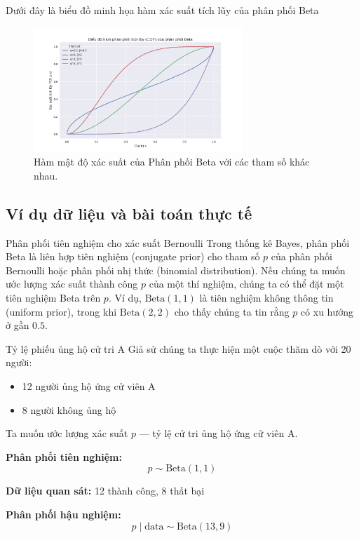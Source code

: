 Dưới đây là biểu đồ minh họa hàm xác suất tích lũy của phân phối Beta

\begin{figure}[h!]
\centering
\includegraphics[width=0.7\textwidth]{images/Beta_Distribution_CDF.png} %
\caption{Hàm mật độ xác suất của Phân phối Beta với các tham số khác nhau.}
\label{fig:Beta_Distribution_CDF}
\end{figure}

\subsection{Ví dụ dữ liệu và bài toán thực tế}
Phân phối tiên nghiệm cho xác suất Bernoulli
Trong thống kê Bayes, phân phối Beta là liên hợp tiên nghiệm (conjugate prior) cho tham số $p$ của phân phối Bernoulli hoặc phân phối nhị thức (binomial distribution). Nếu chúng ta muốn ước lượng xác suất thành công $p$ của một thí nghiệm, chúng ta có thể đặt một tiên nghiệm Beta trên $p$. Ví dụ, $\text{Beta}(1,1)$ là tiên nghiệm không thông tin (uniform prior), trong khi $\text{Beta}(2,2)$ cho thấy chúng ta tin rằng $p$ có xu hướng ở gần $0.5$.

Tỷ lệ phiếu ủng hộ cử tri A
Giả sử chúng ta thực hiện một cuộc thăm dò với 20 người:

\begin{itemize}
  \item 12 người ủng hộ ứng cử viên A
  \item 8 người không ủng hộ
\end{itemize}

Ta muốn ước lượng xác suất $p$ — tỷ lệ cử tri ủng hộ ứng cử viên A.

\textbf{Phân phối tiên nghiệm:}
\[
p \sim \text{Beta}(1, 1)
\]

\textbf{Dữ liệu quan sát:} 12 thành công, 8 thất bại

\textbf{Phân phối hậu nghiệm:}
\[
p \mid \text{data} \sim \text{Beta}(13, 9)
\]

